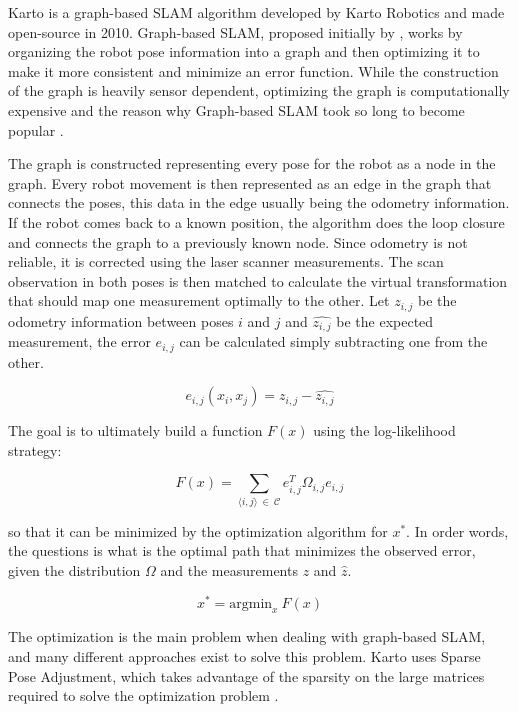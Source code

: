 Karto is a graph-based SLAM algorithm developed by Karto Robotics and made open-source in 2010. Graph-based SLAM, proposed initially by \citeauthor{lu1997globally}, works by organizing the robot pose information into a graph and then optimizing it to make it more consistent and minimize an error function. While the construction of the graph is heavily sensor dependent, optimizing the graph is computationally expensive and the reason why Graph-based SLAM took so long to become popular \cite{grisetti2010tutorial}.

The graph is constructed representing every pose for the robot as a node in the graph. Every robot movement is then represented as an edge in the graph that connects the poses, this data in the edge usually being the odometry information. If the robot comes back to a known position, the algorithm does the loop closure and connects the graph to a previously known node. Since odometry is not reliable, it is corrected using the laser scanner measurements. The scan observation in both poses is then matched to calculate the virtual transformation that should map one measurement optimally to the other. Let $z_{i,j}$ be the odometry information between poses $i$ and $j$ and $\hat{z_{i,j}}$ be the expected measurement, the error $e_{i,j}$ can be calculated simply subtracting one from the other.

\begin{equation}
    e_{i,j}(x_i, x_j) = z_{i,j} - \hat{z_{i,j}}
\end{equation}

The goal is to ultimately build a function $F(x)$ using the log-likelihood strategy:

\begin{equation}
    F(x) = \sum_{\langle i, j \rangle \ \in \ \mathcal{C}} e_{i,j}^T \Omega_{i,j} e_{i,j}
\end{equation}

so that it can be minimized by the optimization algorithm for $x^*$. In order words, the questions is what is the optimal path that minimizes the observed error, given the distribution $\Omega$ and the measurements $z$ and $\hat{z}$.

\begin{equation}
    x^* = \text{argmin}_x \ F(x)
\end{equation}

The optimization is the main problem when dealing with graph-based SLAM, and many different approaches exist to solve this problem. Karto uses Sparse Pose Adjustment, which takes advantage of the sparsity on the large matrices required to solve the optimization problem \cite{konolige2010efficient}.

